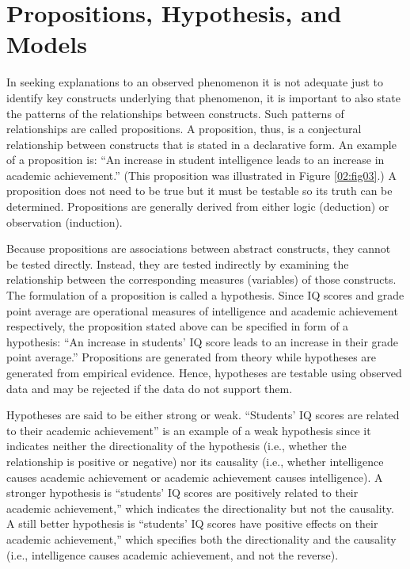 \section{Propositions, Hypothesis, and Models}

In seeking explanations to an observed phenomenon it is not adequate just to identify key constructs underlying that phenomenon, it is important to also state the patterns of the relationships between constructs. Such patterns of relationships are called propositions. A proposition, thus, is a conjectural relationship between constructs that is stated in a declarative form. An example of a proposition is: ``An increase in student intelligence leads to an increase in academic achievement.'' (This proposition was illustrated in Figure \ref{02:fig03}.) A proposition does not need to be true but it must be testable so its truth can be determined. Propositions are generally derived from either logic (deduction) or observation (induction).

Because propositions are associations between abstract constructs, they cannot be tested directly. Instead, they are tested indirectly by examining the relationship between the corresponding measures (variables) of those constructs. The formulation of a proposition is called a \gls{hypothesis}. Since IQ scores and grade point average are operational measures of intelligence and academic achievement respectively, the proposition stated above can be specified in form of a hypothesis: ``An increase in students' IQ score leads to an increase in their grade point average.'' Propositions are generated from theory while hypotheses are generated from empirical evidence. Hence, hypotheses are testable using observed data and may be rejected if the data do not support them. 

Hypotheses are said to be either strong or weak. ``Students' IQ scores are related to their academic achievement'' is an example of a weak hypothesis since it indicates neither the directionality of the hypothesis (i.e., whether the relationship is positive or negative) nor its causality (i.e., whether intelligence causes academic achievement or academic achievement causes intelligence). A stronger hypothesis is ``students' IQ scores are positively related to their academic achievement,'' which indicates the directionality but not the causality. A still better hypothesis is ``students' IQ scores have positive effects on their academic achievement,'' which specifies both the directionality and the causality (i.e., intelligence causes academic achievement, and not the reverse).

